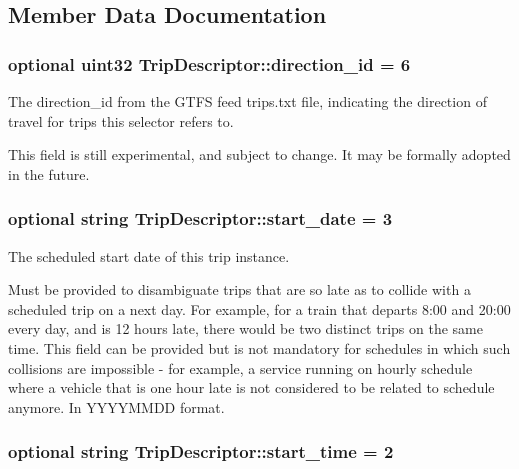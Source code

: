 \subsection{Member Data Documentation}
\subsubsection[{\texorpdfstring{direction\+\_\+id}{direction_id}}]{\setlength{\rightskip}{0pt plus 5cm}optional uint32 Trip\+Descriptor\+::direction\+\_\+id = 6}\hypertarget{structTripDescriptor_a02d3a6531b0514b318dccd7edf4a3fee}{}\label{structTripDescriptor_a02d3a6531b0514b318dccd7edf4a3fee}


The direction\+\_\+id from the G\+T\+FS feed trips.\+txt file, indicating the direction of travel for trips this selector refers to. 

This field is still experimental, and subject to change. It may be formally adopted in the future. 
\subsubsection[{\texorpdfstring{start\+\_\+date}{start_date}}]{\setlength{\rightskip}{0pt plus 5cm}optional string Trip\+Descriptor\+::start\+\_\+date = 3}\hypertarget{structTripDescriptor_a24d4363686da053b0eadbf04313a5055}{}\label{structTripDescriptor_a24d4363686da053b0eadbf04313a5055}


The scheduled start date of this trip instance. 

Must be provided to disambiguate trips that are so late as to collide with a scheduled trip on a next day. For example, for a train that departs 8\+:00 and 20\+:00 every day, and is 12 hours late, there would be two distinct trips on the same time. This field can be provided but is not mandatory for schedules in which such collisions are impossible -\/ for example, a service running on hourly schedule where a vehicle that is one hour late is not considered to be related to schedule anymore. In Y\+Y\+Y\+Y\+M\+M\+DD format. 
\subsubsection[{\texorpdfstring{start\+\_\+time}{start_time}}]{\setlength{\rightskip}{0pt plus 5cm}optional string Trip\+Descriptor\+::start\+\_\+time = 2}\hypertarget{structTripDescriptor_a799660dd75143d643c5552ac945fe16e}{}\label{structTripDescriptor_a799660dd75143d643c5552ac945fe16e}


